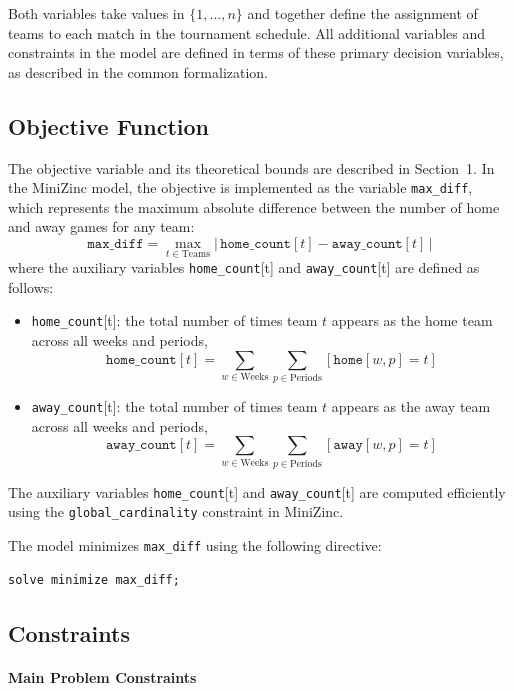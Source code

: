 \documentclass[11pt]{article}
\begin{document}
Both variables take values in $\{1, \ldots, n\}$ and together define the assignment of teams to each match in the tournament schedule. All additional variables and constraints in the model are defined in terms of these primary decision variables, as described in the common formalization.

\subsection{Objective Function}

The objective variable and its theoretical bounds are described in Section~1. In the MiniZinc model, the objective is implemented as the variable \texttt{max\_diff}, which represents the maximum absolute difference between the number of home and away games for any team:
\[
\texttt{max\_diff} = \max_{t \in \text{Teams}} \left|\,\texttt{home\_count}[t] - \texttt{away\_count}[t]\,\right|
\]
where the auxiliary variables \texttt{home\_count}[t] and \texttt{away\_count}[t] are defined as follows:
\begin{itemize}
    \item \texttt{home\_count}[t]: the total number of times team $t$ appears as the home team across all weeks and periods,
    \[
    \texttt{home\_count}[t] = \sum_{w \in \text{Weeks}} \sum_{p \in \text{Periods}} [\texttt{home}[w,p] = t]
    \]
    \item \texttt{away\_count}[t]: the total number of times team $t$ appears as the away team across all weeks and periods,
    \[
    \texttt{away\_count}[t] = \sum_{w \in \text{Weeks}} \sum_{p \in \text{Periods}} [\texttt{away}[w,p] = t]
    \]
\end{itemize}

The auxiliary variables \texttt{home\_count}[t] and \texttt{away\_count}[t] are computed efficiently using the \texttt{global\_cardinality} constraint in MiniZinc.

The model minimizes \texttt{max\_diff} using the following directive:
\begin{verbatim}
solve minimize max_diff;
\end{verbatim}

\subsection{Constraints}

\paragraph{Main Problem Constraints}
\end{document}
